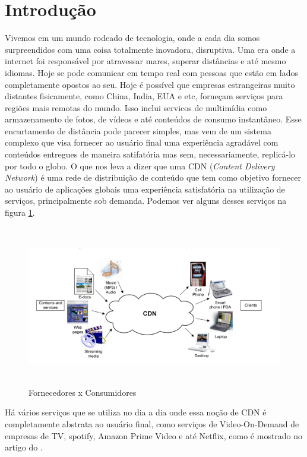 \section{Introdu\c{c}\~ao}

Vivemos em um mundo rodeado de tecnologia, onde a cada dia somos surpreendidos com uma coisa totalmente inovadora, disruptiva. Uma era onde a internet foi respons\'avel por atravessar mares, superar dist\^ancias e at\'e mesmo idiomas. Hoje se pode comunicar em tempo real com pessoas que est\~ao em lados completamente opostos ao seu. 
\newline
Hoje \'e poss\'ivel que empresas estrangeiras muito distantes fisicamente, como China, India, EUA e etc, forne\c{c}am servi\c{c}os para regi\~oes mais remotas do mundo. Isso inclui servi{c}os de multim\'idia como armazenamento de fotos, de v\'ideos e at\'e conte\'udos de consumo instant\^aneo.
\newline
Esse encurtamento de dist\^ancia pode parecer simples, mas vem de um sistema complexo que visa fornecer ao usu\'ario final uma experi\^encia agrad\'avel com conte\'udos entregues de maneira satifat\'oria mas sem, necessariamente, replic\'a-lo por todo o globo. O que nos leva a dizer que uma CDN (\textit{Content Delivery Network}) \'e uma rede de distribui\c{c}\~ao de conte\'udo que tem como objetivo fornecer ao usu\'ario de aplica\c{c}\~oes globais uma experi\^encia satisfat\'oria na utiliza\c{c}\~ao de servi\c{c}os, principalmente sob demanda. Podemos ver alguns desses servi\c{c}os na figura \ref{figura:contextualizacao}.
\begin{figure}[H]
\includegraphics[height=7cm]{Figuras/contextualizacao.png}
\caption{Fornecedores x Consumidores} 
\label{figura:contextualizacao} 
\end{figure}
H\'a v\'arios servi\c{c}os que se utiliza no dia a dia onde essa no\c{c}\~ao de CDN \'e completamente abstrata ao usu\'ario final, como servi\c{c}os de Video-On-Demand de empresas de TV, spotify, Amazon Prime Video e at\'e Netflix, como \'e mostrado no artigo do \cite{adhikari2012unreeling}.
